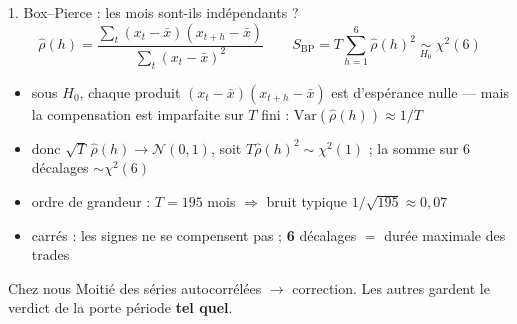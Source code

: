\documentclass[10pt]{beamer}
\begin{document}
\begin{frame}{1. Box--Pierce : les mois sont-ils indépendants ?}
  \[
    \hat\rho(h) = \frac{\sum_{t}(x_t-\bar x)(x_{t+h}-\bar x)}
                       {\sum_{t}(x_t-\bar x)^2}
    \qquad
    S_{\mathrm{BP}} = T\sum_{h=1}^{6}\hat\rho(h)^2
    \;\underset{H_0}{\sim}\; \chi^2(6)
  \]
  \begin{itemize}\setlength{\itemsep}{2.5mm}
    \item sous $H_0$, chaque produit $(x_t-\bar x)(x_{t+h}-\bar x)$ est
      d'espérance nulle --- mais la compensation est imparfaite sur $T$
      fini : $\mathrm{Var}(\hat\rho(h)) \approx 1/T$
    \item donc $\sqrt T\,\hat\rho(h)\to\mathcal N(0,1)$, soit
      $T\hat\rho(h)^2\sim\chi^2(1)$ ; la somme sur 6 décalages
      $\sim\chi^2(6)$
    \item ordre de grandeur : $T=195$ mois $\Rightarrow$ bruit typique
      $1/\sqrt{195}\approx 0{,}07$
    \item carrés : les signes ne se compensent pas ; \textbf{6} décalages
      $=$ durée maximale des trades
  \end{itemize}
  \vspace{1mm}
  \begin{block}{Chez nous}
    Moitié des séries autocorrélées $\to$ correction. Les autres gardent le
    verdict de la porte période \textbf{tel quel}.
  \end{block}
\end{frame}
\end{document}
